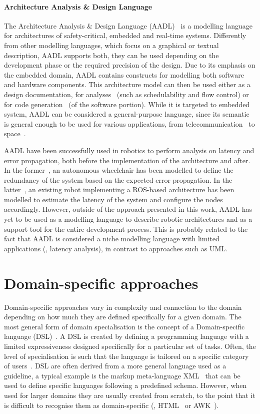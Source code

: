\paragraph{Architecture Analysis \& Design Language} The  Architecture Analysis \& Design Language (AADL)~\cite{feiler2006architecture} is a modelling language for architectures of safety-critical, embedded and real-time systems. Differently from other modelling languages, which focus on a graphical or textual description, AADL supports both, they can be used depending on the development phase or the required precision of the design. Due to its emphasis on the embedded domain, AADL contains constructs for modelling both software and hardware components. This architecture model can then be used either as a design documentation, for analyses~\cite{feiler2004open} (such as schedulability and flow control) or for code generation~\cite{hugues2008prototype} (of the software portion). While it is targeted to embedded system, AADL can be considered a general-purpose language, since its semantic is general enough to be used for various applications, from telecommunication~\cite{delanote2008using} to space~\cite{perrotin2011taste}.

AADL have been successfully used in robotics to perform analysis on latency and error propagation, both before the implementation of the architecture and after. In the former~\cite{biggs2014modelling}, an autonomous wheelchair has been modelled to define the redundancy of the system based on the expected error propagation. In the latter~\cite{larsen2016modelling}, an existing robot implementing a ROS-based architecture has been modelled to estimate the latency of the system and configure the nodes accordingly. However, outside of the approach presented in this work, AADL has yet to be used as a modelling language to describe robotic architectures and as a support tool for the entire development process. This is probably related to the fact that AADL is considered a niche modelling language with limited applications (\eg, latency analysis), in contrast to approaches such as UML.

\section{Domain-specific approaches}
Domain-specific approaches vary in complexity and connection to the domain depending on how much they are defined specifically for a given domain. The most general form of domain specialisation is the concept of a Domain-specific language (DSL)~\cite{fowler2010domain}.  A DSL is created by defining a programming language with a limited expressiveness designed specifically for a particular set of tasks. Often, the level of specialisation is such that the language is tailored on a specific category of users~\cite{voelter2013dsl}. DSL are often derived from a more general language used as a guideline, a typical example is the markup meta-language XML~\cite{harold1998xml} that can be used to define specific languages following a predefined schema. However, when used for larger domains they are usually created from scratch, to the point that it is difficult to recognise them as domain-specific (\eg, HTML~\cite{graham1995html} or AWK~\cite{dougherty1997sed}).

